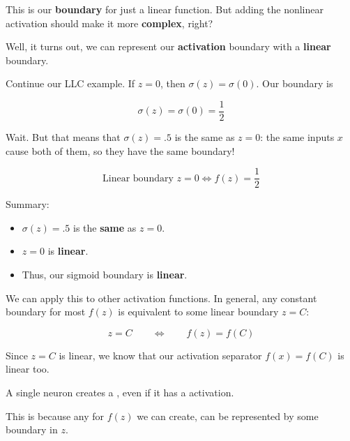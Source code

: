         This is our \textbf{boundary} for just a linear function. But adding the nonlinear activation should make it more \textbf{complex}, right? 
        
        Well, it turns out, we can represent our \textbf{activation} boundary with a \textbf{linear} boundary.
        
        \miniex Continue our LLC example. If $z=0$, then $\sigma(z) = \sigma(0)$. Our boundary is
        
        \begin{equation}
            \sigma(z)=\sigma(0)=\frac{1}{2}
        \end{equation}
        
        Wait. But that means that $\sigma(z)=.5$ is the same as $z=0$: the same inputs $x$ cause both of them, so they have the same boundary!
        
        \begin{equation}
            \text{Linear boundary } z=0 \Longleftrightarrow f(z)=\frac{1}{2}
        \end{equation}
        
        Summary:
        
        \begin{itemize}
            \item $\sigma(z)=.5$ is the \textbf{same} as $z=0$.
            \item $z=0$ is \textbf{linear}.
            \item Thus, our sigmoid boundary is \textbf{linear}.
        \end{itemize}
        
        We can apply this to other activation functions. In general, any constant boundary for most $f(z)$ is equivalent to some linear boundary $z=C$:
        
        \begin{equation}
            z=C 
            \qquad
            \Longleftrightarrow
            \qquad
            f(z)=f(C)
        \end{equation}
        
        Since $z=C$ is linear, we know that our activation separator $f(x)=f(C)$ is linear too.\\
        
        \begin{concept}
            A single neuron creates a , even if it has a  activation.
            
            This is because any  for $f(z)$ we can create, can be represented by some  boundary in $z$.
        \end{concept}
        
